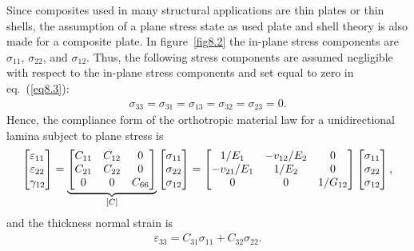 \documentclass{AeroStructure-ERJohnson}
\begin{document}
Since composites used in many structural applications are thin
plates or thin shells, the assumption of a plane stress state as
used plate and shell theory is also made for a composite plate. In
figure~\ref{fig8.2} the in-plane stress components are
$\sigma_{11}$, $\sigma_{22}$, and $\sigma_{12}$. Thus, the
following stress components are assumed negligible with respect to
the in-plane stress components and set equal to zero in
eq.~(\ref{eq8.3}):
\begin{align}\label{eq8.24}
\sigma_{33}=\sigma_{31}=\sigma_{13}=\sigma_{32}=\sigma_{23}=0.
\end{align}
Hence, the compliance form of the orthotropic material law for a
unidirectional lamina subject to plane stress is
\begin{align}\label{eq8.25}
\left[\begin{array}{@{}l@{}} \varepsilon_{11}\\
\varepsilon_{22}\\
\gamma_{12}
\end{array}\right]=\underbrace{\left[\begin{array}{@{}ccc@{}}
C_{11} & C_{12} & 0\\
C_{21} & C_{22} & 0\\
0 & 0 & C_{66}
\end{array}\right]}_{[C]}\left[\begin{array}{@{}l@{}} \sigma_{11}\\
\sigma_{22}\\
\sigma_{12}
\end{array}\right]=\left[\begin{array}{@{}ccc@{}} 1/ E_{1} &
-v_{12}/ E_{2} & 0\\
-v_{21}/ E_{1} & 1/ E_{2} & 0\\
0 & 0 &
1/ G_{12} \end{array}\right]\left[\begin{array}{@{}l@{}}
\sigma_{11}\\
\sigma_{22}\\
\sigma_{12} \end{array}\right] ,
\end{align}
and the thickness normal strain is
\begin{align}\label{eq8.26}
\varepsilon_{33}=C_{31} \sigma_{11}+C_{32} \sigma_{22}.
\end{align}
\vspace*{1pt}\vspace*{-8pt}
\clearpage
\end{document}
